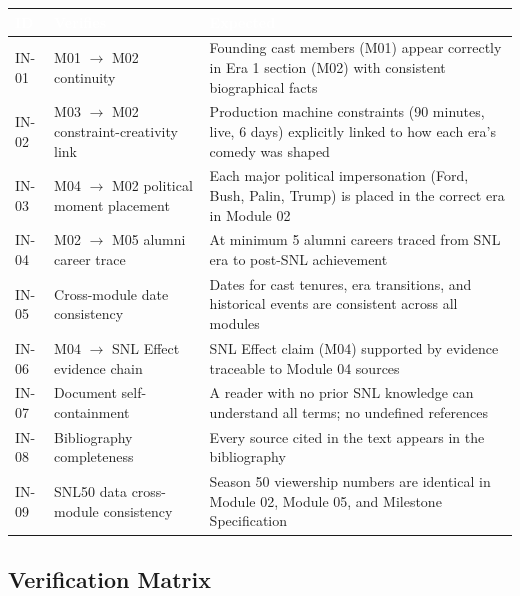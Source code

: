 \documentclass[11pt,letterpaper]{article}
\newcommand{\tableheader}[1]{\textbf{\sffamily\textcolor{white}{#1}}}
\begin{document}
\begin{center}
\begin{tabularx}{\textwidth}{L{1.5cm}XL{3.5cm}}
\toprule
{}
\tableheader{ID} & \tableheader{Verifies} & \tableheader{Expected} \\
\midrule
IN-01 & M01 $\to$ M02 continuity & Founding cast members (M01) appear correctly in Era 1 section (M02) with consistent biographical facts \\
IN-02 & M03 $\to$ M02 constraint-creativity link & Production machine constraints (90 minutes, live, 6 days) explicitly linked to how each era's comedy was shaped \\
IN-03 & M04 $\to$ M02 political moment placement & Each major political impersonation (Ford, Bush, Palin, Trump) is placed in the correct era in Module 02 \\
IN-04 & M02 $\to$ M05 alumni career trace & At minimum 5 alumni careers traced from SNL era to post-SNL achievement \\
IN-05 & Cross-module date consistency & Dates for cast tenures, era transitions, and historical events are consistent across all modules \\
IN-06 & M04 $\to$ SNL Effect evidence chain & SNL Effect claim (M04) supported by evidence traceable to Module 04 sources \\
IN-07 & Document self-containment & A reader with no prior SNL knowledge can understand all terms; no undefined references \\
IN-08 & Bibliography completeness & Every source cited in the text appears in the bibliography \\
IN-09 & SNL50 data cross-module consistency & Season 50 viewership numbers are identical in Module 02, Module 05, and Milestone Specification \\
\bottomrule
\end{tabularx}
\end{center}

\subsection{Verification Matrix}
\end{document}
